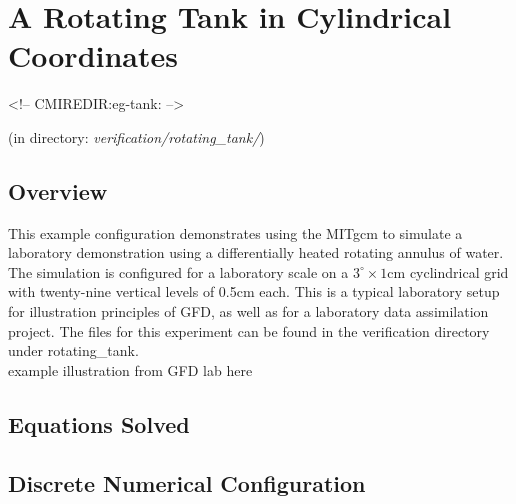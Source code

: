 

%
%

\section{A Rotating Tank in Cylindrical Coordinates}
\label{sect:eg-tank}
\label{www:tutorials}
\begin{rawhtml}
<!-- CMIREDIR:eg-tank: -->
\end{rawhtml}
\begin{center}
(in directory: {\it verification/rotating\_tank/})
\end{center}

\subsection{Overview}
\label{www:tutorials}
                                                                          
This example configuration demonstrates using the MITgcm to simulate a
laboratory demonstration using a differentially heated rotating
annulus of water.  The simulation is configured for a laboratory scale
on a $3^{\circ}\times1\mathrm{cm}$ cyclindrical grid with twenty-nine
vertical levels of 0.5cm each.  This is a typical laboratory setup for
illustration principles of GFD, as well as for a laboratory data
assimilation project. The files for this experiment can be found in
the verification directory under rotating\_tank.
\\

example illustration from GFD lab here
\\



 

\subsection{Equations Solved}
\label{www:tutorials}


\subsection{Discrete Numerical Configuration}
\label{www:tutorials}

